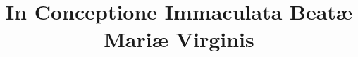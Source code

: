 \documentclass[17pt]{extarticle}
\begin{document}
\title{In Conceptione Immaculata Beatæ Mariæ Virginis}
\makereadingtitle

\end{document}
